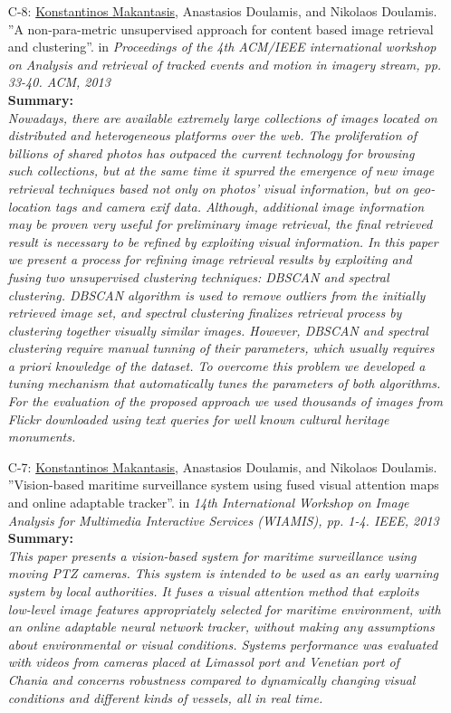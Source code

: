\documentclass[a4paper,10pt]{article}
\begin{document}
\begin{itemize}
	\item [C-8:]\underline{Konstantinos Makantasis}, Anastasios Doulamis, and Nikolaos Doulamis. ''A non-para-metric unsupervised approach for content based image retrieval and clustering''. in \textit{Proceedings of the 4th ACM/IEEE international workshop on Analysis and retrieval of tracked events and motion in imagery stream, pp. 33-40. ACM, 2013}\\
	\textbf{Summary:}\\
	\textit{Nowadays, there are available extremely large collections of images located on distributed and heterogeneous platforms over the web. The proliferation of billions of shared photos has outpaced the current technology for browsing such collections, but at the same time it spurred the emergence of new image retrieval techniques based not only on photos' visual information, but on geo-location tags and camera exif data. Although, additional image information may be proven very useful for preliminary image retrieval, the final retrieved result is necessary to be refined by exploiting visual information. In this paper we present a process for refining image retrieval results by exploiting and fusing two unsupervised clustering techniques: DBSCAN and spectral clustering. DBSCAN algorithm is used to remove outliers from the initially retrieved image set, and spectral clustering finalizes retrieval process by clustering together visually similar images. However, DBSCAN and spectral clustering require manual tunning of their parameters, which usually requires a priori knowledge of the dataset. To overcome this problem we developed a tuning mechanism that automatically tunes the parameters of both algorithms. For the evaluation of the proposed approach we used thousands of images from Flickr downloaded using text queries for well known cultural heritage monuments.}
	
	\item [C-7:]\underline{Konstantinos Makantasis}, Anastasios Doulamis, and Nikolaos Doulamis. ''Vision-based maritime surveillance system using fused visual attention maps and online adaptable tracker''. in \textit{14th International Workshop on Image Analysis for Multimedia Interactive Services (WIAMIS), pp. 1-4. IEEE, 2013}\\
	\textbf{Summary:}\\
	\textit{This paper presents a vision-based system for maritime surveillance using moving PTZ cameras. This system is intended to be used as an early warning system by local authorities. It fuses a visual attention method that exploits low-level image features appropriately selected for maritime environment, with an online adaptable neural network tracker, without making any assumptions about environmental or visual conditions. Systems performance was evaluated with videos from cameras placed at Limassol port and Venetian port of Chania and concerns robustness compared to dynamically changing visual conditions and different kinds of vessels, all in real time.}
	

\end{itemize}
\end{document}
